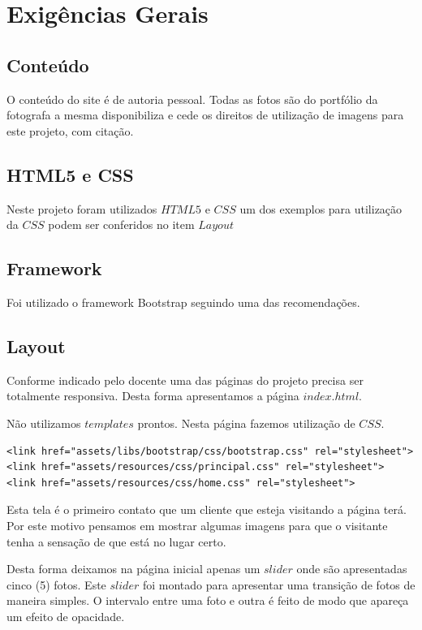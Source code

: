 \chapter{Exigências Gerais}
\section{Conteúdo}

	O conteúdo do site é de autoria pessoal. Todas as fotos são do portfólio da fotografa a mesma disponibiliza e cede os direitos de utilização de imagens para este projeto, com citação.

\section{HTML5 e CSS}

	Neste projeto foram utilizados $HTML5$ e $CSS$ um dos exemplos para utilização da $CSS$ podem ser conferidos no item $Layout$
	
     
\section{Framework}

	Foi utilizado o framework Bootstrap seguindo uma das recomendações.

\section{Layout}
	Conforme indicado pelo docente uma das páginas do projeto precisa ser totalmente responsiva. Desta forma apresentamos a página $index.html$.
	
	Não utilizamos $templates$ prontos. Nesta página fazemos utilização de $CSS$.
	
\begin{lstlisting}
<link href="assets/libs/bootstrap/css/bootstrap.css" rel="stylesheet">
<link href="assets/resources/css/principal.css" rel="stylesheet">
<link href="assets/resources/css/home.css" rel="stylesheet">
\end{lstlisting}	
	
	Esta tela é o primeiro contato que um cliente que esteja visitando a página terá. Por este motivo pensamos em mostrar algumas imagens para que o visitante tenha a sensação de que está no lugar certo. 
	
	Desta forma deixamos na página inicial apenas um $slider$ onde são apresentadas cinco (5) fotos. Este $slider$ foi montado para apresentar uma transição de fotos de maneira simples. O intervalo entre uma foto e outra é feito de modo que apareça um efeito de opacidade.
	
